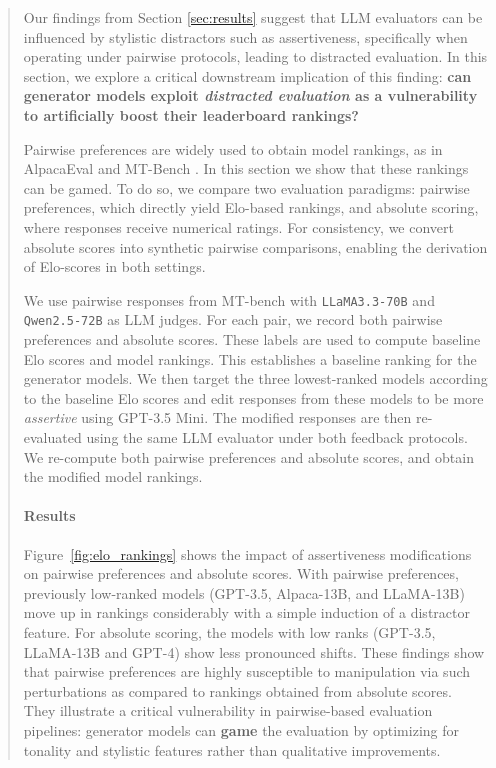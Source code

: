 \documentclass{article}
\begin{document}
\begin{abstract}
 Our findings from Section \ref{sec:results}  suggest that LLM evaluators can be influenced by stylistic distractors such as assertiveness, specifically when operating under pairwise protocols, leading to distracted evaluation. In this section, we explore a critical downstream implication of this finding: \textbf{can generator models exploit \textit{distracted evaluation} as a vulnerability to artificially boost their leaderboard rankings?}

Pairwise preferences are widely used to obtain model rankings, as in AlpacaEval \citep{dubois2024alpacafarmsimulationframeworkmethods} and MT-Bench \citep{chiang2024chatbot}. In this section we show that these rankings can be gamed.  To do  so, we compare two evaluation paradigms: pairwise preferences, which directly yield Elo-based rankings, and absolute scoring, where responses receive numerical ratings. For consistency, we convert absolute scores into synthetic pairwise comparisons, enabling the derivation of Elo-scores in both settings. 

We use pairwise responses from MT-bench with \texttt{LLaMA3.3-70B} and \texttt{Qwen2.5-72B} as LLM judges. For each pair, we record both pairwise preferences and absolute scores. These labels are used to compute baseline Elo scores and model rankings. This establishes a baseline ranking for the generator models. We  then target the three lowest-ranked models according to the baseline Elo scores and edit responses from these models to be more \textit{assertive} using GPT-3.5 Mini. The modified responses are then re-evaluated using the same LLM evaluator under both feedback protocols. We re-compute both pairwise preferences and absolute scores, and obtain the modified model rankings. 

\paragraph{Results}
Figure~\ref{fig:elo_rankings} shows the impact of assertiveness modifications on pairwise preferences and absolute scores. With pairwise preferences, previously low-ranked models (GPT-3.5, Alpaca-13B, and LLaMA-13B) move up in rankings considerably with a simple induction of a distractor feature. For absolute scoring, the models with low ranks (GPT-3.5, LLaMA-13B and GPT-4) show less pronounced shifts. These findings show that pairwise preferences are highly susceptible to manipulation via such perturbations as compared to rankings obtained from absolute scores. They illustrate a critical vulnerability in pairwise-based evaluation pipelines: generator models can \textbf{game} the evaluation by optimizing for tonality and stylistic features rather than qualitative improvements. 


\end{abstract}
\end{document}
